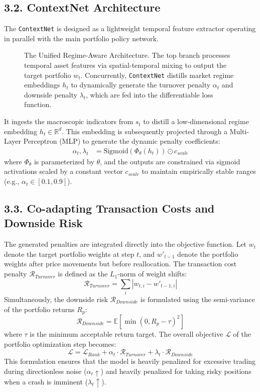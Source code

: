 \documentclass[letterpaper]{article} %
\begin{document}
\subsection{3.2. ContextNet Architecture}
The \texttt{ContextNet} is designed as a lightweight temporal feature extractor operating in parallel with the main portfolio policy network. 

\begin{figure}[h]
\centering
\caption{The Unified Regime-Aware Architecture. The top branch processes temporal asset features via spatial-temporal mixing to output the target portfolio $w_t$. Concurrently, \texttt{ContextNet} distills market regime embeddings $h_t$ to dynamically generate the turnover penalty $\alpha_t$ and downside penalty $\lambda_t$, which are fed into the differentiable loss function.}
\label{fig:arch}
\end{figure}

It ingests the macroscopic indicators from $s_t$ to distill a low-dimensional regime embedding $h_t \in \mathbb{R}^d$. This embedding is subsequently projected through a Multi-Layer Perceptron (MLP) to generate the dynamic penalty coefficients:
\begin{align}
    \alpha_t, \lambda_t &= \text{Sigmoid}(\Phi_{\theta}(h_t)) \odot c_{scale}
\end{align}
where $\Phi_{\theta}$ is parameterized by $\theta$, and the outputs are constrained via sigmoid activations scaled by a constant vector $c_{scale}$ to maintain empirically stable ranges (e.g., $\alpha_t \in [0.1, 0.9]$).

\subsection{3.3. Co-adapting Transaction Costs and Downside Risk}
The generated penalties are integrated directly into the objective function. Let $w_t$ denote the target portfolio weights at step $t$, and $w'_{t-1}$ denote the portfolio weights after price movements but before reallocation. The transaction cost penalty $\mathcal{R}_{Turnover}$ is defined as the $L_1$-norm of weight shifts:
\begin{equation}
    \mathcal{R}_{Turnover} = \sum_{i} |w_{t,i} - w'_{t-1,i}|
\end{equation}
Simultaneously, the downside risk $\mathcal{R}_{Downside}$ is formulated using the semi-variance of the portfolio returns $R_p$:
\begin{equation}
    \mathcal{R}_{Downside} = \mathbb{E}\left[ \min(0, R_p - \tau)^2 \right]
\end{equation}
where $\tau$ is the minimum acceptable return target. The overall objective $\mathcal{L}$ of the portfolio optimization step becomes:
\begin{equation}
    \mathcal{L} = \mathcal{L}_{Rank} + \alpha_t \cdot \mathcal{R}_{Turnover} + \lambda_t \cdot \mathcal{R}_{Downside}
\end{equation}
This formulation ensures that the model is heavily penalized for excessive trading during directionless noise ($\alpha_t \uparrow$) and heavily penalized for taking risky positions when a crash is imminent ($\lambda_t \uparrow$).
\end{document}
